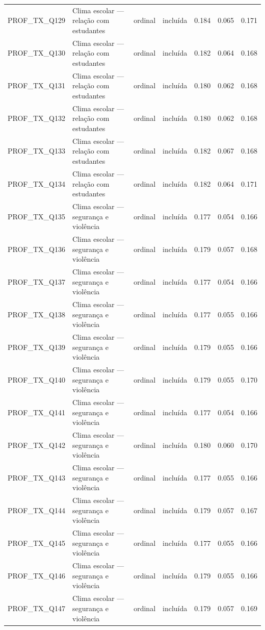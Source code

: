 \begin{tabular}{llllrrr}
PROF\_TX\_Q129 & Clima escolar — relação com estudantes & ordinal & incluída & 0.184 & 0.065 & 0.171 \\
PROF\_TX\_Q130 & Clima escolar — relação com estudantes & ordinal & incluída & 0.182 & 0.064 & 0.168 \\
PROF\_TX\_Q131 & Clima escolar — relação com estudantes & ordinal & incluída & 0.180 & 0.062 & 0.168 \\
PROF\_TX\_Q132 & Clima escolar — relação com estudantes & ordinal & incluída & 0.180 & 0.062 & 0.168 \\
PROF\_TX\_Q133 & Clima escolar — relação com estudantes & ordinal & incluída & 0.182 & 0.067 & 0.168 \\
PROF\_TX\_Q134 & Clima escolar — relação com estudantes & ordinal & incluída & 0.182 & 0.064 & 0.171 \\
PROF\_TX\_Q135 & Clima escolar — segurança e violência & ordinal & incluída & 0.177 & 0.054 & 0.166 \\
PROF\_TX\_Q136 & Clima escolar — segurança e violência & ordinal & incluída & 0.179 & 0.057 & 0.168 \\
PROF\_TX\_Q137 & Clima escolar — segurança e violência & ordinal & incluída & 0.177 & 0.054 & 0.166 \\
PROF\_TX\_Q138 & Clima escolar — segurança e violência & ordinal & incluída & 0.177 & 0.055 & 0.166 \\
PROF\_TX\_Q139 & Clima escolar — segurança e violência & ordinal & incluída & 0.179 & 0.055 & 0.166 \\
PROF\_TX\_Q140 & Clima escolar — segurança e violência & ordinal & incluída & 0.179 & 0.055 & 0.170 \\
PROF\_TX\_Q141 & Clima escolar — segurança e violência & ordinal & incluída & 0.177 & 0.054 & 0.166 \\
PROF\_TX\_Q142 & Clima escolar — segurança e violência & ordinal & incluída & 0.180 & 0.060 & 0.170 \\
PROF\_TX\_Q143 & Clima escolar — segurança e violência & ordinal & incluída & 0.177 & 0.055 & 0.166 \\
PROF\_TX\_Q144 & Clima escolar — segurança e violência & ordinal & incluída & 0.179 & 0.057 & 0.167 \\
PROF\_TX\_Q145 & Clima escolar — segurança e violência & ordinal & incluída & 0.177 & 0.055 & 0.166 \\
PROF\_TX\_Q146 & Clima escolar — segurança e violência & ordinal & incluída & 0.179 & 0.055 & 0.166 \\
PROF\_TX\_Q147 & Clima escolar — segurança e violência & ordinal & incluída & 0.179 & 0.057 & 0.169 \\

\end{tabular}
